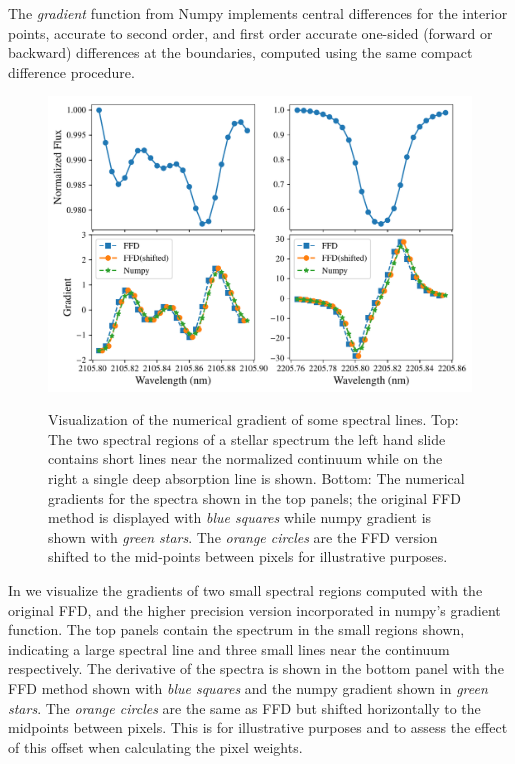 The \emph{gradient} function from Numpy implements central differences for the interior points, accurate to second order, and first order accurate one-sided (forward or backward) differences at the boundaries, computed using the same compact difference procedure.

\begin{figure}
    \centering
   \includegraphics[width=0.8\linewidth]{figures/information-content/spectral_gradients}\\
    \caption{Visualization of the numerical gradient of some spectral lines. Top: The two spectral regions of a stellar spectrum the left hand slide contains short lines near the normalized continuum while on the right a single deep absorption line is shown. Bottom: The numerical gradients for the spectra shown in the top panels; the original {FFD} method is displayed  with \emph{blue squares} while numpy gradient is shown with \emph{green stars}. The \emph{orange circles} are the {FFD} version shifted to the mid-points between pixels for illustrative purposes.}
    \label{fig:gradients}
\end{figure}




In  we visualize the gradients of two small spectral regions computed with the original {FFD}, and the higher precision version incorporated in numpy's gradient function.
The top panels contain the spectrum in the small regions shown, indicating a large spectral line and three small lines near the continuum respectively.
The derivative of the spectra is shown in the bottom panel with the {FFD} method shown with \emph{blue squares} and the numpy gradient shown in \emph{green stars}.
The \emph{orange circles} are the same as {FFD} but shifted horizontally to the midpoints between  pixels.
This is for illustrative purposes and to assess the effect of this offset when calculating the pixel weights.

